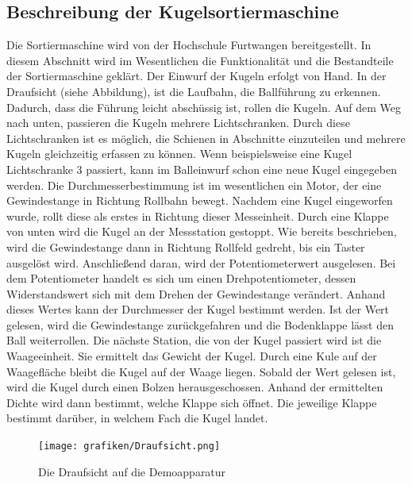 \documentclass[12pt,a4paper]{article}
\begin{document}
\subsection{Beschreibung der Kugelsortiermaschine}
Die Sortiermaschine wird von der Hochschule Furtwangen bereitgestellt. In diesem Abschnitt wird im Wesentlichen die Funktionalität und die Bestandteile der Sortiermaschine geklärt.
Der Einwurf der Kugeln erfolgt von Hand. In der Draufsicht (siehe Abbildung), ist die Laufbahn, die Ballführung zu erkennen. Dadurch, dass die Führung leicht abschüssig ist, rollen die Kugeln. Auf dem Weg nach unten, passieren die Kugeln mehrere Lichtschranken. Durch diese Lichtschranken ist es möglich, die Schienen in Abschnitte einzuteilen und mehrere Kugeln gleichzeitig erfassen zu können. Wenn beispielsweise eine Kugel Lichtschranke 3 passiert, kann im Balleinwurf schon eine neue Kugel eingegeben werden. Die Durchmesserbestimmung ist im wesentlichen ein Motor, der eine Gewindestange in Richtung Rollbahn bewegt. Nachdem eine Kugel eingeworfen wurde, rollt diese als erstes in Richtung dieser Messeinheit. Durch eine Klappe von unten wird die Kugel an der Messstation gestoppt. Wie bereits beschrieben, wird die Gewindestange dann in Richtung Rollfeld gedreht, bis ein Taster ausgelöst wird. Anschließend daran, wird der Potentiometerwert ausgelesen. Bei dem Potentiometer handelt es sich um einen Drehpotentiometer, dessen Widerstandswert sich mit dem Drehen der Gewindestange verändert. Anhand dieses Wertes kann der Durchmesser der Kugel bestimmt werden. Ist der Wert gelesen, wird die Gewindestange zurückgefahren und die Bodenklappe lässt den Ball weiterrollen. Die nächste Station, die von der Kugel passiert wird ist die Waageeinheit. Sie ermittelt das Gewicht der Kugel. Durch eine Kule auf der Waagefläche bleibt die Kugel auf der Waage liegen. Sobald der Wert gelesen ist, wird die Kugel durch einen Bolzen herausgeschossen. Anhand der ermittelten Dichte wird dann bestimmt, welche Klappe sich öffnet. Die jeweilige Klappe bestimmt darüber, in welchem Fach die Kugel landet.
\begin{figure}[ht]
\begin{center}
\texttt{[image: grafiken/Draufsicht.png]}
\caption{Die Draufsicht auf die Demoapparatur}
\label{draufsicht_sortiermaschine}
\end{center}
\end{figure}
\end{document}
